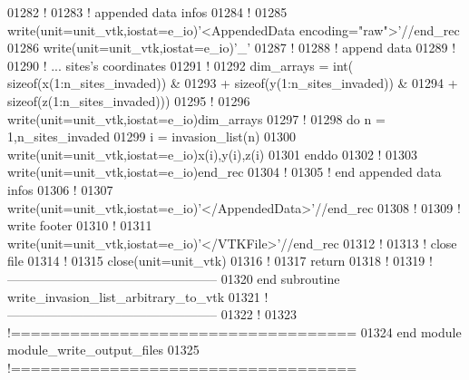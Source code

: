 \begin{DoxyCode}
01282 \textcolor{comment}{!}
01283 \textcolor{comment}{! appended data infos}
01284 \textcolor{comment}{!}
01285 \textcolor{keyword}{write}(unit=unit\_vtk,iostat=e\_io)\textcolor{stringliteral}{'<AppendedData encoding="raw">'}//end\_rec
01286 \textcolor{keyword}{write}(unit=unit\_vtk,iostat=e\_io)\textcolor{stringliteral}{'\_'}
01287 \textcolor{comment}{!}
01288 \textcolor{comment}{! append data }
01289 \textcolor{comment}{!}
01290 \textcolor{comment}{! ... sites's coordinates}
01291 \textcolor{comment}{!}
01292 dim\_arrays =  int( sizeof(x(1:n\_sites\_invaded)) &
01293                  + sizeof(y(1:n\_sites\_invaded)) &
01294                  + sizeof(z(1:n\_sites\_invaded)))
01295 \textcolor{comment}{!}
01296 \textcolor{keyword}{write}(unit=unit\_vtk,iostat=e\_io)dim\_arrays
01297 \textcolor{comment}{!}
01298 \textcolor{keyword}{do} n = 1,n\_sites\_invaded
01299    i = invasion\_list(n)
01300    \textcolor{keyword}{write}(unit=unit\_vtk,iostat=e\_io)x(i),y(i),z(i)
01301 \textcolor{keyword}{enddo}
01302 \textcolor{comment}{!}
01303 \textcolor{keyword}{write}(unit=unit\_vtk,iostat=e\_io)end\_rec
01304 \textcolor{comment}{!}
01305 \textcolor{comment}{! end appended data infos}
01306 \textcolor{comment}{!}
01307 \textcolor{keyword}{write}(unit=unit\_vtk,iostat=e\_io)\textcolor{stringliteral}{'</AppendedData>'}//end\_rec
01308 \textcolor{comment}{!}
01309 \textcolor{comment}{! write footer}
01310 \textcolor{comment}{!}
01311 \textcolor{keyword}{write}(unit=unit\_vtk,iostat=e\_io)\textcolor{stringliteral}{'</VTKFile>'}//end\_rec
01312 \textcolor{comment}{!}
01313 \textcolor{comment}{! close file}
01314 \textcolor{comment}{!}
01315 \textcolor{keyword}{close}(unit=unit\_vtk)
01316 \textcolor{comment}{!}
01317 return
01318 \textcolor{comment}{!}
01319 \textcolor{comment}{!--------------------------------------------------}
01320 \textcolor{keyword}{end subroutine write\_invasion\_list\_arbitrary\_to\_vtk}
01321 \textcolor{comment}{!--------------------------------------------------}
01322 \textcolor{comment}{!}
01323 \textcolor{comment}{!===================================}
01324 \textcolor{keyword}{end module module\_write\_output\_files}
01325 \textcolor{comment}{!===================================}
\end{DoxyCode}
